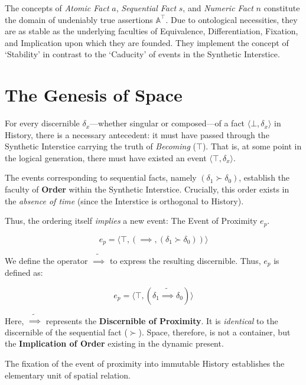 \documentclass[11pt, a4paper]{article}
\theoremstyle{formalism}
\begin{document}
The concepts of \textit{Atomic Fact} $a$, \textit{Sequential Fact} $s$, and \textit{Numeric Fact} $n$ constitute the domain of undeniably true assertions $\mathbb{A}^\top$. Due to ontological necessities, they are as stable as the underlying faculties of Equivalence, Differentiation, Fixation, and Implication upon which they are founded. They implement the concept of `Stability' in contrast to the `Caducity' of events in the Synthetic Interstice.

\section{The Genesis of Space}

For every discernible $\delta_x$---whether singular or composed---of a fact $\langle \bot, \delta_x \rangle$ in History, there is a necessary antecedent: it must have passed through the Synthetic Interstice carrying the truth of \textit{Becoming} ($\top$). That is, at some point in the logical generation, there must have existed an event $\langle \top, \delta_x \rangle$.

The events corresponding to sequential facts, namely $(\delta_1 \succ \delta_0)$, establish the faculty of \textbf{Order} within the Synthetic Interstice. Crucially, this order exists in the \textit{absence of time} (since the Interstice is orthogonal to History).

Thus, the ordering itself \textit{implies} a new event: The Event of Proximity $e_p$.

\begin{equation}
    e_p = \langle \top, \left (\implies, (\delta_1 \succ \delta_0) \right ) \rangle
\end{equation}

We define the operator $\tilde{\implies}$ to express the resulting discernible. Thus, $e_p$ is defined as:

\begin{equation}
    e_p = \langle \top, (\delta_1 \tilde{\implies} \delta_0) \rangle
\end{equation}

Here, $\tilde{\implies}$ represents the \textbf{Discernible of Proximity}. It is \textit{identical} to the discernible of the sequential fact ($\succ$). Space, therefore, is not a container, but the \textbf{Implication of Order} existing in the dynamic present.

The fixation of the event of proximity into immutable History establishes the elementary unit of spatial relation.
\end{document}
